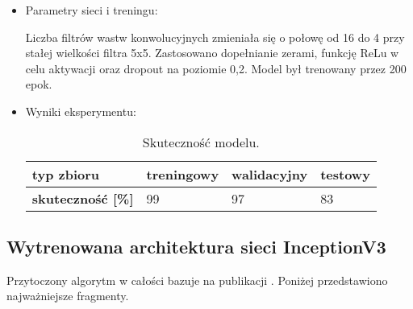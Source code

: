 {\begin{itemize}
\item Parametry sieci i treningu:

Liczba filtrów wastw konwolucyjnych zmieniała się o połowę od 16 do 4 przy stałej wielkości filtra 5x5. Zastosowano dopełnianie zerami, funkcję ReLu w celu aktywacji oraz dropout na poziomie 0,2. Model był trenowany przez 200 epok.
\item Wyniki eksperymentu:

\begin{table}[h]
\centering
\caption[Short Heading]{Skuteczność modelu.}
\begin{tabular}{|l|l|l|l|}
\hline
\textbf{typ zbioru}           & \textbf{treningowy} & \textbf{walidacyjny} & \textbf{testowy} \\ \hline
\textbf{skuteczność {[}\%{]}} & 99                  & 97                   & 83               \\ \hline
\end{tabular}
\end{table}

\end{itemize}
}

\subsection{Wytrenowana architektura sieci InceptionV3}
Przytoczony algorytm w całości bazuje na publikacji \cite{kaggle_3}. Poniżej przedstawiono najważniejsze fragmenty.

